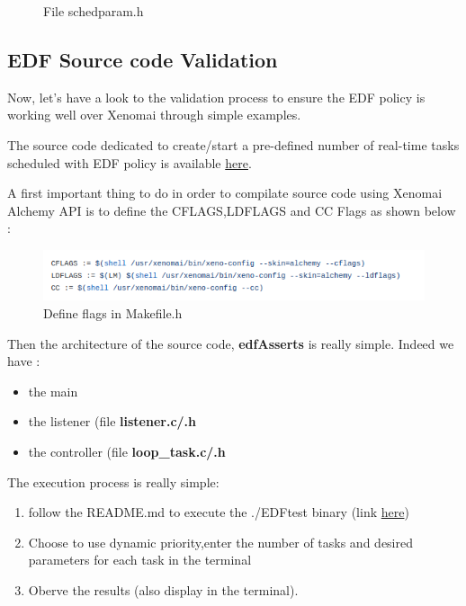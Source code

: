 \documentclass[12pt,hidelinks]{article}
\begin{document}
{\begin{figure}
\begin{minipage}{0.45\textwidth}
            \caption{File schedparam.h}
        \end{minipage}
    \end{figure}
    


    \newpage
    \subsection{EDF Source code Validation} \label{validation}
    
    Now, let's have a look to the validation process to ensure the EDF policy is working well over Xenomai through simple examples.
    
    The source code dedicated to create/start a pre-defined number of real-time tasks scheduled with EDF policy is available \href{https://github.com/skyultime/M2_ERTS_Project_Xenomai_edh/tree/main/Tests/EDFonXenomai/edfAsserts}{here}.
    
    A first important thing to do in order to compilate source code using Xenomai Alchemy API is to define the CFLAGS,LDFLAGS and CC Flags as shown below :
    
    \begin{figure}[ht]
        \centering
        \includegraphics[scale=1]{flagsDefMakefile.png}
        \caption{Define flags in Makefile.h}
	\end{figure} \newline
    
    Then the architecture of the source code, \textbf{edfAsserts} is really simple.\newline
    Indeed we have :
    \begin{itemize}
        \item the main
        \item the listener (file \textbf{listener.c/.h}
        \item the controller (file \textbf{loop_task.c/.h}
    \end{itemize}
    
    The execution process is really simple:
    \begin{enumerate}
        \item follow the README.md to execute the ./EDFtest binary (link \href{https://github.com/skyultime/M2_ERTS_Project_Xenomai_edh/tree/main/Tests/EDFonXenomai/edfAsserts}{here})
        \item Choose to use dynamic priority,enter the number of tasks and desired parameters for each task in the terminal
        \item Oberve the results (also display in the terminal).
    

\end{enumerate}}
\end{document}
